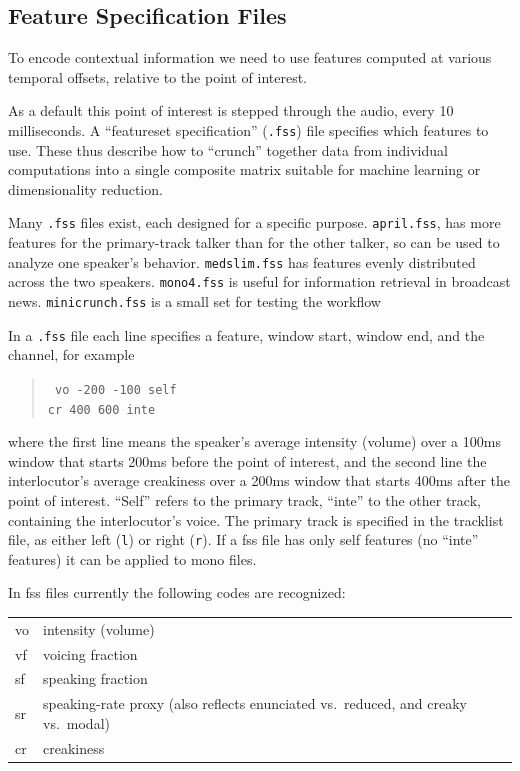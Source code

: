 \documentclass[11pt]{article}
\begin{document}
\subsection{Feature Specification Files}     \label{featurespec-files}

To encode contextual information we need to use features computed at
various temporal offsets, relative to the point of interest.

As a default this point of interest is stepped through the audio,
every 10 milliseconds.  A ``featureset specification'' ({\tt .fss})
file specifies which features to use.  These thus describe how to
``crunch'' together data from individual computations into a single
composite matrix suitable for machine learning or dimensionality
reduction.

Many {\tt .fss} files exist, each designed for a specific purpose.
{\tt april.fss}, has more features for the primary-track talker than
for the other talker, so can be used to analyze one speaker's
behavior.  {\tt medslim.fss} has features evenly distributed across
the two speakers.  {\tt mono4.fss} is useful for information retrieval
in broadcast news.  {\tt minicrunch.fss} is a small set for testing
the workflow

In a {\tt .fss} file each line specifies a feature, window start,
window end, and the channel, for example

\begin{quote}{\tt 
    vo   -200   -100 self  \\
    cr    400    600 inte
}\end{quote}

where the first line means the speaker's average intensity (volume)
over a 100ms window that starts 200ms before the point of interest,
and the second line the interlocutor's average creakiness over a 200ms
window that starts 400ms after the point of interest.  ``Self'' refers
to the primary track, ``inte'' to the other track, containing the
interlocutor's voice.  The primary track is specified in the tracklist
file, as either left ({\tt l}) or right ({\tt r}).  If a fss file has only self
features (no ``inte'' features) it can be applied to mono files.


In fss files currently the following codes are recognized:


\begin{tabular}{ll}
  vo  & intensity (volume) \\
  vf  & voicing fraction \\
  sf  & speaking fraction \\
  sr  & speaking-rate proxy (also reflects enunciated vs.~reduced, and creaky vs.~modal) \\
  cr  & creakiness \\
\end{tabular}
\end{document}
